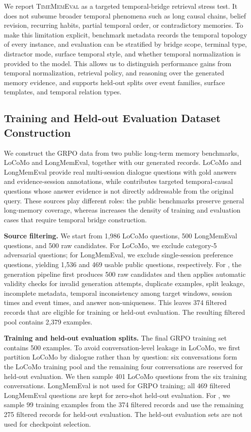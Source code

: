   We report \textsc{TimeMemEval} as a targeted temporal-bridge retrieval stress
  test. It does not subsume broader temporal phenomena such as long causal chains,
  belief revision, recurring habits, partial temporal order, or contradictory
  memories. To make this limitation explicit, benchmark metadata records the
  temporal topology of every instance, and evaluation can be stratified by bridge
  scope, terminal type, distractor mode, surface temporal style, and whether
  temporal normalization is provided to the model. This allows us to distinguish
  performance gains from temporal normalization, retrieval policy, and reasoning
  over the generated memory evidence, and supports held-out splits over event
  families, surface templates, and temporal relation types.

\subsection{Training and Held-out Evaluation Dataset Construction}
\label{app:train-valid-data-construction}

We construct the GRPO data from two public long-term memory benchmarks,
LoCoMo and LongMemEval, together with our generated \bench records. LoCoMo and
LongMemEval provide real multi-session dialogue questions with gold answers and
evidence-session annotations, while \bench contributes targeted
temporal-causal questions whose answer evidence is not directly addressable from
the original query. These sources play different roles: the public benchmarks
preserve general long-memory coverage, whereas \bench increases the density of
training and evaluation cases that require temporal bridge construction.

\textbf{Source filtering.}
We start from 1,986 LoCoMo questions, 500 LongMemEval questions, and 500 raw
\bench candidates. For LoCoMo, we exclude category-5 adversarial questions; for
LongMemEval, we exclude single-session preference questions, yielding 1,536 and
469 usable public questions, respectively. For \bench, the generation pipeline
first produces 500 raw candidates and then applies automatic validity checks for
invalid generation attempts, duplicate examples, split leakage, incomplete
metadata, temporal inconsistency among target windows, session times and event
times, and answer non-uniqueness. This leaves 374 filtered \bench records that
are eligible for training or held-out evaluation. The resulting filtered pool
contains 2,379 examples.

\textbf{Training and held-out evaluation splits.}
The final GRPO training set contains 500 examples. To avoid conversation-level
leakage in LoCoMo, we first partition LoCoMo by dialogue rather than by
question: six conversations form the LoCoMo training pool and the remaining four
conversations are reserved for held-out evaluation. We then sample 401 LoCoMo
questions from the six training conversations. LongMemEval is not used for GRPO
training; all 469 filtered LongMemEval questions are kept for zero-shot
held-out evaluation. For \bench, we sample 99 training examples from the 374
filtered records and use the remaining 275 filtered records for held-out
evaluation. The held-out evaluation sets are not used for checkpoint selection.

